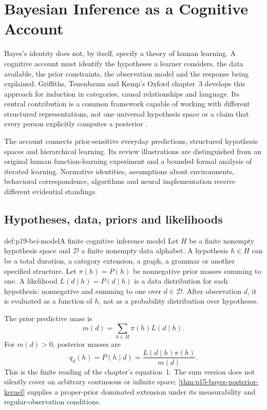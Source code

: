 \chapter{Bayesian Inference as a Cognitive Account}
\label{sec:p19-bayesian-cognitive-inference}

Bayes's identity does not, by itself, specify a theory of human learning.
A cognitive account must identify the hypotheses a learner considers,
the data available, the prior constraints, the observation model and the
response being explained. Griffiths, Tenenbaum and Kemp's Oxford chapter~3
develops this approach for induction in categories, causal relationships
and language. Its central contribution is a common framework capable of
working with different structured representations, not one universal
hypothesis space or a claim that every person explicitly computes a posterior
\cite[pp.~22--35]{GriffithsTenenbaumKemp2012BayesianInference}.

The account connects prior-sensitive everyday predictions, structured
hypothesis spaces and hierarchical learning. Its review illustrations
are distinguished from an original human function-learning experiment
and a bounded formal analysis of iterated learning. Normative identities,
assumptions about environments, behavioral correspondence, algorithms
and neural implementation receive different evidential standings.

\section{Hypotheses, data, priors and likelihoods}
\label{sec:p19-bci-model}

\begin{hbdefinition}{def:p19-bci-model}{A finite cognitive inference model}
Let \(H\) be a finite nonempty hypothesis space and \(\mathcal D\) a
finite nonempty data alphabet. A hypothesis \(h\in H\) can be a total
duration, a category extension, a graph, a grammar or another specified
structure. Let \(\pi(h)=P(h)\) be nonnegative prior masses summing to
one. A likelihood \(L(d\mid h)=P(d\mid h)\) is a data distribution
for each hypothesis: nonnegative and summing to one over \(d\in\mathcal D\).
After observation \(d\), it is evaluated as a function of \(h\), not
as a probability distribution over hypotheses.

The prior predictive mass is
\[
 m(d)=\sum_{h\in H}\pi(h)L(d\mid h).
\]
For \(m(d)>0\), posterior masses are
\[
 q_d(h)=P(h\mid d)=\frac{L(d\mid h)\pi(h)}{m(d)}.
\]
This is the finite reading of the chapter's equation~1. The sum version
does not silently cover an arbitrary continuous or infinite space;
\cref{thm:p15-bayes-posterior-kernel} supplies a proper-prior dominated
extension under its measurability and regular-observation conditions.
\end{hbdefinition}

